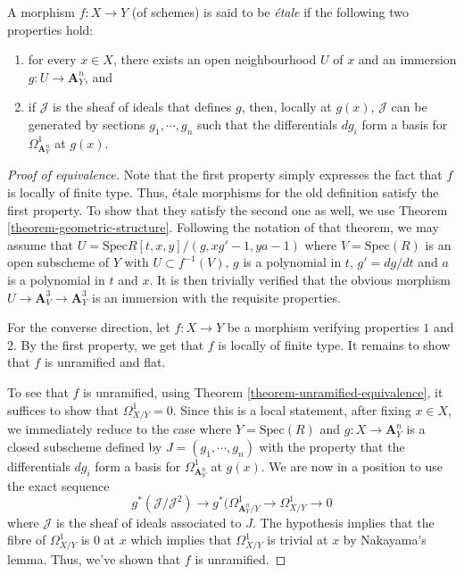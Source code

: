 \begin{definition}
\label{definition-etale-differential}
A morphism $f:X \to Y$ (of schemes) is said to be
{\it \'etale} if the following
two properties hold:
\begin{enumerate}
\item for every $x \in X$, there exists an open neighbourhood $U$ of $x$ and an 
immersion $g:U \to \mathbf{A}^n_Y$, and
\item if $\mathcal{J}$ is the sheaf of ideals that defines $g$, then, locally at
$g(x)$, $\mathcal{J}$ can be generated by sections $g_1,\cdots,g_n$ such that 
the
differentials $dg_i$ form a basis for $\Omega^1_{\mathbf{A}^n_Y}$ at $g(x)$.  
\end{enumerate}
\end{definition}

\begin{proof}[Proof of equivalence]
Note that the first property simply expresses the fact that $f$ is locally of
finite type. Thus, \'etale morphisms for the old definition satisfy the first
property. To show that they satisfy the second one as well, we use Theorem
\ref{theorem-geometric-structure}. Following the notation of that theorem,
we may assume that $U = \text{Spec}  R[t,x,y]/(g,xg' - 1, ya - 1)$ where
$V = \text{Spec}(R)$ is an open subscheme of $Y$ with $U \subset f^{-1}(V)$, $g$
is a polynomial in $t$, $g' = dg/dt$ and $a$ is a polynomial in $t$ and $x$.
It is then trivially verified that the obvious morphism
$U \to \mathbf{A}^3_V \to \mathbf{A}^3_Y$ is an immersion with the requisite 
properties.

\medskip\noindent
For the converse direction, let $f:X \to Y$ be a morphism verifying properties
$1$ and $2$. By the first property, we get that $f$ is locally of finite type.
It remains to show that $f$ is unramified and flat.

\medskip\noindent
To see that $f$ is unramified, using Theorem
\ref{theorem-unramified-equivalence}, it suffices to show that
$\Omega^1_{X/Y} = 0$. Since this is a local statement, after fixing $x \in X$,
we immediately reduce to the case where $Y = \text{Spec}(R)$ and $g:X \to 
\mathbf{A}^n_Y$ is
a closed subscheme defined by $J = (g_1,\cdots,g_n)$ with the property that
the differentials $dg_i$ form a basis for $\Omega^1_{\mathbf{A}^n_Y}$ at 
$g(x)$. We
are now in a position to use the exact sequence 
$$
g^*(\mathcal{J}/\mathcal{J}^2) \to g^*(\Omega^1_{\mathbf{A}^n_Y/Y} \to 
\Omega^1_{X/Y} \to 0
$$
where $\mathcal{J}$ is the sheaf of ideals associated to $J$. The hypothesis 
implies
that the fibre of $\Omega^1_{X/Y}$ is $0$ at $x$ which implies that
$\Omega^1_{X/Y}$ is trivial at $x$ by Nakayama's lemma. Thus, we've shown
that $f$ is unramified.


\end{proof}

